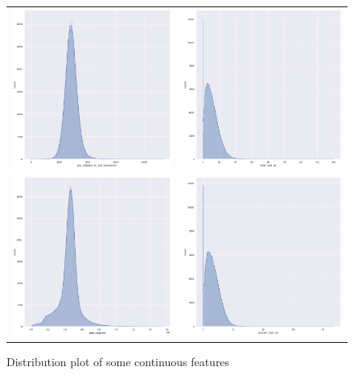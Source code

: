 \begin{figure}[H]
    \centering
    \begin{tabular}{cc}
        \includegraphics[width=0.5\linewidth]{res/imgs/plots/avg_distance.png} &
        \includegraphics[width=0.5\linewidth]{res/imgs/plots/time.png} \\
        \includegraphics[width=0.5\linewidth]{res/imgs/plots/distance.png} &
        \includegraphics[width=0.5\linewidth]{res/imgs/plots/high_air.png} \\
    \end{tabular}
    \caption{Distribution plot of some continuous features}
    \label{fig:cat_features}
\end{figure}

